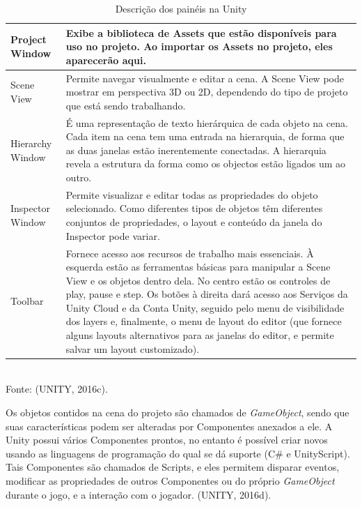 \documentclass[12pt,a4paper]{article}
\newcommand{\source}[1]{\small Fonte: {#1}}
\begin{document}
			\begin{table}[ht]
				\label{tabelaUnity}
				\caption{Descrição dos painéis na Unity}
				\centering
				\small
				\begin{tabular}{p{3.1cm} p{11.9cm}}
					\hline 
					Project Window & Exibe a biblioteca de Assets que estão disponíveis para uso no projeto. Ao importar os Assets no projeto, eles aparecerão aqui. \\ 
					\hline 
					Scene View & Permite navegar visualmente e editar a cena. A Scene View pode mostrar em perspectiva 3D ou 2D, dependendo do tipo de projeto que está sendo trabalhando. \\ 
					\hline 
					Hierarchy Window & É uma representação de texto hierárquica de cada objeto na cena. Cada item na cena tem uma entrada na hierarquia, de forma que as duas janelas estão inerentemente conectadas. A hierarquia revela a estrutura da forma como os objectos estão ligados um ao outro. \\ 
					\hline 
					Inspector Window & Permite visualizar e editar todas as propriedades do objeto selecionado. Como diferentes tipos de objetos têm diferentes conjuntos de propriedades, o layout e conteúdo da janela do Inspector pode variar. \\ 
					\hline 
					Toolbar & Fornece acesso aos recursos de trabalho mais essenciais. À esquerda estão as ferramentas básicas para manipular a Scene View e os objetos dentro dela. No centro estão os controles de play, pause e step. Os botões à direita dará acesso aos Serviços da Unity Cloud e da Conta Unity, seguido pelo menu de visibilidade dos layers e, finalmente, o menu de layout do editor (que fornece alguns layouts alternativos para as janelas do editor, e permite salvar um layout customizado). \\ 
					\hline 
				\end{tabular}\\
				\vspace{3mm}
				\source{(UNITY, 2016c).}
			\end{table}
			
			Os objetos contidos na cena do projeto são chamados de \textit{GameObject},
			sendo que suas características podem ser alteradas por Componentes anexados a ele.
			A Unity possui vários Componentes prontos,
			no entanto é possível criar novos usando as linguagens de programação do qual se dá suporte (C\# e UnityScript).
			Tais Componentes são chamados de Scripts,
			e eles permitem disparar eventos,
			modificar as propriedades de outros Componentes ou do próprio \textit{GameObject} durante o jogo,
			e a interação com o jogador.
			(UNITY, 2016d).
\end{document}
